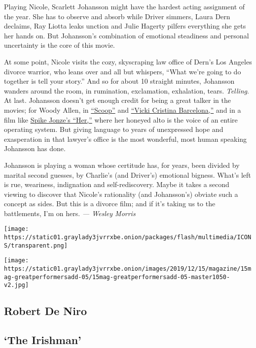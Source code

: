 Playing Nicole, Scarlett Johansson might have the hardest acting
assignment of the year. She has to observe and absorb while Driver
simmers, Laura Dern declaims, Ray Liotta leaks unction and Julie Hagerty
pilfers everything she gets her hands on. But Johansson's combination of
emotional steadiness and personal uncertainty is the core of this movie.

At some point, Nicole visits the cozy, skyscraping law office of Dern's
Los Angeles divorce warrior, who leans over and all but whispers, ``What
we're going to do together is tell your story.'' And so for about 10
straight minutes, Johansson wanders around the room, in rumination,
exclamation, exhalation, tears. \emph{Telling}. At last. Johansson
doesn't get enough credit for being a great talker in the movies; for
Woody Allen, in
\href{https://www.nytimes3xbfgragh.onion/2006/07/28/movies/28scoo.html}{``Scoop''}
and
\href{https://www.nytimes3xbfgragh.onion/2008/08/15/movies/15barc.html}{``Vicki
Cristina Barcelona,''} and in a film like
\href{https://www.nytimes3xbfgragh.onion/2013/12/18/movies/her-directed-by-spike-jonze.html}{Spike
Jonze's ``Her,''} where her honeyed alto is the voice of an entire
operating system. But giving language to years of unexpressed hope and
exasperation in that lawyer's office is the most wonderful, most human
speaking Johansson has done.

Johansson is playing a woman whose certitude has, for years, been
divided by marital second guesses, by Charlie's (and Driver's) emotional
bigness. What's left is rue, weariness, indignation and
self-rediscovery. Maybe it takes a second viewing to discover that
Nicole's rationality (and Johansson's) obviate such a concept as sides.
But this is a divorce film; and if it's taking us to the battlements,
I'm on hers. \emph{--- Wesley Morris}

\texttt{[image: https://static01.graylady3jvrrxbe.onion/packages/flash/multimedia/ICONS/transparent.png]}

\texttt{[image: https://static01.graylady3jvrrxbe.onion/images/2019/12/15/magazine/15mag-greatperformersadd-05/15mag-greatperformersadd-05-master1050-v2.jpg]}

\hypertarget{robert-de-niro}{%
\subsection{Robert De Niro}\label{robert-de-niro}}

\hypertarget{the-irishman}{%
\subsection{`The Irishman'}\label{the-irishman}}

